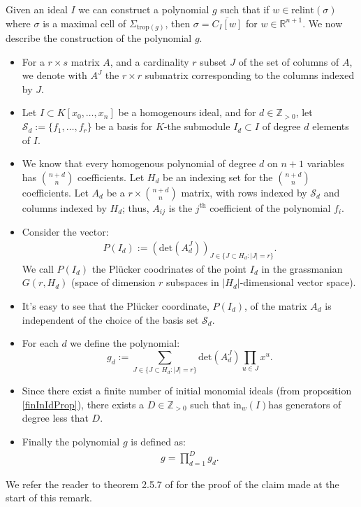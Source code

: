 \begin{remark}
    Given an ideal $I$ we can construct a polynomial $g$ such that if $w \in \text{relint}(\sigma)$ where $\sigma$ is a maximal cell of $\Sigma_{\text{trop}(g)}$, then $\sigma = \overline{C_I[w]}$ for $w \in \mathbb{R}^{n+1}$. 
    We now describe the construction of the polynomial $g$. 
    \begin{itemize}
        \item For a $r \times s$ matrix $A$, and a cardinality $r$ subset $J$ of the set of columns of $A$, we denote with $A^{J}$ the $r \times r$ submatrix corresponding to the columns indexed by $J$.
        \item Let $I \subset K[x_{0}, \dots, x_{n}]$ be a homogenours ideal, and for $d \in \mathbb{Z}_{>0}$, let $\mathcal{S}_{d}:=\{f_{1},\dots, f_{r}\}$ be a basis for $K$-the submodule $I_{d}\subset I$ of degree $d$ elements of $I$.
        \item We know that every homogenous polynomial of degree $d$ on $n+1$ variables has $\binom{n+d}{n}$ coefficients. 
            Let $H_{d}$ be an indexing set for the $\binom{n+d}{n}$ coefficients.
            Let $A_{d}$ be a $r \times \binom{n+d}{n}$ matrix, with rows indexed by $\mathcal{S}_{d}$ and columns indexed by $H_{d}$; thus, $A_{ij}$ is the $j^{\text{th}}$ coefficient of the polynomial $f_{i}$.
        \item Consider the vector:
            \begin{align*}
                P(I_{d}) := (\text{det}(A_{d}^{J}))_{ J \in \{{J \subset H_{d}: |J| = r}\}}.
            \end{align*}
            We call $P(I_{d})$ the Pl\"{u}cker coodrinates of the point $I_{d}$ in the grassmanian $G(r, H_{d})$ (space of dimension $r$ subspaces in $|H_{d}|$-dimensional vector space).
        \item It's easy to see that the Pl\"{u}cker coordinate, $P(I_{d})$, of the matrix $A_{d}$ is independent of the choice of the basis set $\mathcal{S}_{d}$.
        \item For each $d$ we define the polynomial:
            \begin{equation*}
                g_{d}:=\sum_{J \in \{{J \subset H_{d}: |J| = r}\}} \text{det}(A^{J}_{d}) \prod_{u \in J}x^{u}.
            \end{equation*}
        \item Since there exist a finite number of initial monomial ideals (from proposition \ref{finInIdProp}), there exists a $D \in \mathbb{Z}_{>0}$ such that $\text{in}_{w}(I)$has generators of degree less that $D$.
        \item Finally the polynomial $g$ is defined as:
            \begin{align*}
                g = \prod_{d = 1}^{D} g_{d}.
            \end{align*}
    \end{itemize}
    We refer the reader to theorem 2.5.7 of \cite{maclagan2015introduction} for the proof of the claim made at the start of this remark.
\end{remark}

